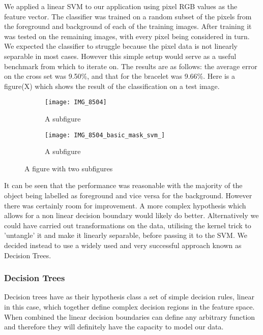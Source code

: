 \documentclass[12pt]{IIBproject}
\begin{document}
We applied a linear SVM to our application using pixel RGB values as the feature vector. The classifier was trained on a random subset of the pixels from the foreground and background of each of the training images. After training it was tested on the remaining images, with every pixel being considered in turn. We expected the classifier to struggle because the pixel data is not linearly separable in most cases.  However this simple setup would serve as a useful benchmark from which to iterate on. The results are as follows: the average error on the cross set was 9.50\%, and that for the bracelet was 9.66\%. Here is a figure(X) which shows the result of the classification on a test image. 
\begin{figure}[H]
\centering
\begin{subfigure}{.5\textwidth}
  \centering
  \texttt{[image: IMG\_8504]}
  \caption{A subfigure}
  \label{fig:sub1}
\end{subfigure}%
\begin{subfigure}{.5\textwidth}
  \centering
  \texttt{[image: IMG\_8504\_basic\_mask\_svm\_]}
  \caption{A subfigure}
  \label{fig:sub2}
\end{subfigure}
\caption{A figure with two subfigures}
\label{fig:test}
\end{figure}

It can be seen that the performance was reasonable with the majority of the object being labelled as foreground and vice versa for the background. However there was certainly room for improvement. A more complex hypothesis which allows for a non linear decision boundary would likely do better. Alternatively we could have carried out transformations on the data, utilising the kernel trick\cite{scholkopft1999fisher} to 'untangle' it and make it linearly separable, before passing it to the SVM. We decided instead to use a widely used and very successful approach known as Decision Trees.
\subsubsection{Decision Trees}

Decision trees have as their hypothesis class a set of simple decision rules, linear in this case, which together define complex decision regions in the feature space.  When combined the linear decision boundaries can define any arbitrary function and therefore they will definitely have the capacity to model our data. 
\end{document}
